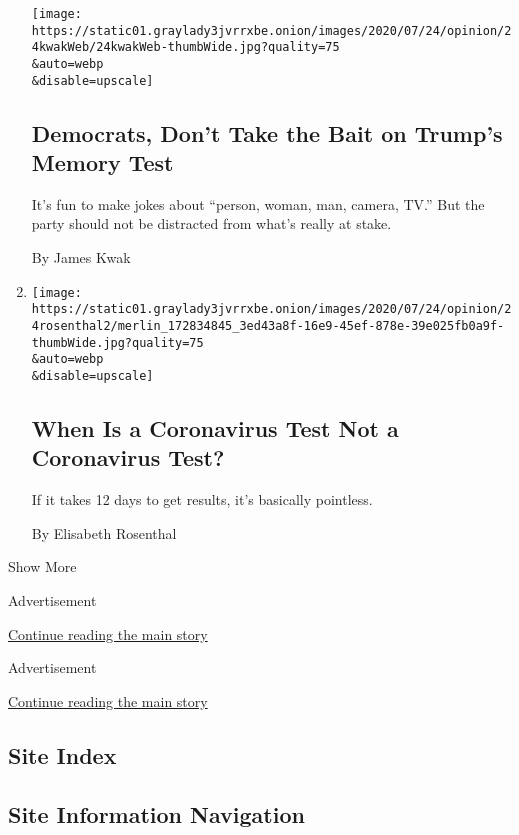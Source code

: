 \begin{enumerate}
  \texttt{[image: https://static01.graylady3jvrrxbe.onion/images/2020/07/24/opinion/24kwakWeb/24kwakWeb-thumbWide.jpg?quality=75\\\&auto=webp\\\&disable=upscale]}

  \hypertarget{democrats-dont-take-the-bait-on-trumps-memory-test}{%
  \subsection{Democrats, Don't Take the Bait on Trump's Memory
  Test}\label{democrats-dont-take-the-bait-on-trumps-memory-test}}

  It's fun to make jokes about ``person, woman, man, camera, TV.'' But
  the party should not be distracted from what's really at stake.

  By James Kwak
\item
  \href{/2020/07/24/opinion/covid-test-turnaround.html}{}

  \texttt{[image: https://static01.graylady3jvrrxbe.onion/images/2020/07/24/opinion/24rosenthal2/merlin\_172834845\_3ed43a8f-16e9-45ef-878e-39e025fb0a9f-thumbWide.jpg?quality=75\\\&auto=webp\\\&disable=upscale]}

  \hypertarget{when-is-a-coronavirus-test-not-a-coronavirus-test}{%
  \subsection{When Is a Coronavirus Test Not a Coronavirus
  Test?}\label{when-is-a-coronavirus-test-not-a-coronavirus-test}}

  If it takes 12 days to get results, it's basically pointless.

  By Elisabeth Rosenthal
\end{enumerate}

Show More

Advertisement

\protect\hyperlink{after-mid2}{Continue reading the main story}

Advertisement

\protect\hyperlink{after-mktg}{Continue reading the main story}

\hypertarget{site-index}{%
\subsection{Site Index}\label{site-index}}

\hypertarget{site-information-navigation}{%
\subsection{Site Information
Navigation}\label{site-information-navigation}}

